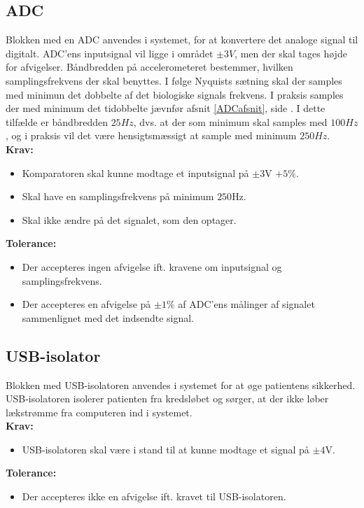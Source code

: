 \subsection{ADC}
Blokken med en ADC anvendes i systemet, for at konvertere det analoge signal til digitalt. %
ADC'ens inputsignal vil ligge i området $\pm3V$, men der skal tages højde for afvigelser. Båndbredden på accelerometeret bestemmer, hvilken samplingsfrekvens der skal benyttes. I følge Nyquists sætning skal der samples med minimun det dobbelte af det biologiske signals frekvens. I praksis samples der med minimum det tidobbelte jævnfør afsnit \ref{ADCafsnit}, side \pageref{ADCafsnit}. I dette tilfælde er båndbredden $25Hz$, dvs. at der som minimum skal samples med $100Hz$, og i praksis vil det være hensigtsmæssigt at sample med minimum $250Hz$. \\
\textbf{Krav:}
\begin{itemize}
	\item Komparatoren skal kunne modtage et inputsignal på $\pm3$V $+5\%$.
	\item Skal have en samplingsfrekvens på minimum $250$Hz.
	\item Skal ikke ændre på det signalet, som den optager.
\end{itemize}
\textbf{Tolerance:}
\begin{itemize}
	\item Der accepteres ingen afvigelse ift. kravene om inputsignal og samplingsfrekvens.
	\item Der accepteres en afvigelse på $\pm1\%$ af ADC'ens målinger af signalet sammenlignet med det indsendte signal.
\end{itemize}
\subsection{USB-isolator}\label{kravspecifikationer_USB}
Blokken med USB-isolatoren anvendes i systemet for at øge patientens sikkerhed. USB-isolatoren isolerer patienten fra kredsløbet og sørger, at der ikke løber lækstrømme fra computeren ind i systemet.\\
\textbf{Krav:}
\begin{itemize}
	\item USB-isolatoren skal være i stand til at kunne modtage et signal på $\pm4$V. 
\end{itemize}
\textbf{Tolerance:} 
\begin{itemize}
	\item Der accepteres ikke en afvigelse ift. kravet til USB-isolatoren. 
\end{itemize}
